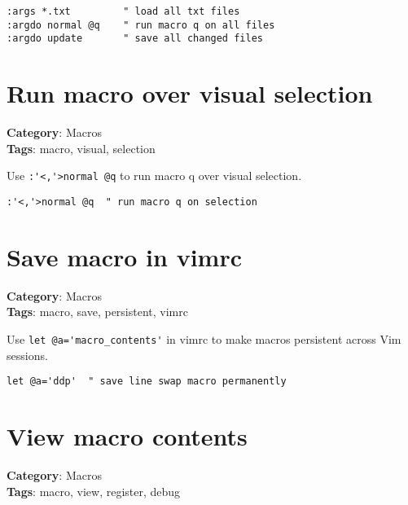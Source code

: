 {{{{{{{\begin{Exa*}{}
\begin{Verbatim}[fontsize=\footnotesize, breaklines, breakanywhere]
:args *.txt         " load all txt files
:argdo normal @q    " run macro q on all files
:argdo update       " save all changed files
\end{Verbatim}
\end{Exa*}

\section{Run macro over visual selection}

\textbf{Category}: Macros\\ \textbf{Tags}: macro, visual, selection
\vspace{0.5cm}

Use {\footnotesize \Verb§:'<,'>normal @q§} to run macro q over visual selection.

\begin{Exa*}{}
\begin{Verbatim}[fontsize=\footnotesize, breaklines, breakanywhere]
:'<,'>normal @q  " run macro q on selection
\end{Verbatim}
\end{Exa*}

\section{Save macro in vimrc}

\textbf{Category}: Macros\\ \textbf{Tags}: macro, save, persistent, vimrc
\vspace{0.5cm}

Use {\footnotesize \Verb§let @a='macro_contents'§} in vimrc to make macros persistent across Vim sessions.

\begin{Exa*}{}
\begin{Verbatim}[fontsize=\footnotesize, breaklines, breakanywhere]
let @a='ddp'  " save line swap macro permanently
\end{Verbatim}
\end{Exa*}

\section{View macro contents}

\textbf{Category}: Macros\\ \textbf{Tags}: macro, view, register, debug
\vspace{0.5cm}

}}}}}}}
